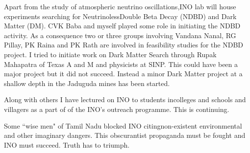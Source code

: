 Apart from the study of atmospheric neutrino oscillations,\break INO lab will 
house experiments searching for Neutrinoless\break Double Beta Decay (NDBD) 
and Dark Matter (DM). CVK Baba and myself played some role in initiating 
the NDBD activity. As a consequence two or three groups involving 
Vandana Nanal, RG Pillay, PK Raina and PK Rath are involved in 
feasibility studies for the NDBD project. I tried to initiate work on 
Dark Matter Search through Rupak Mahapatra of Texas A and M and 
physicists at SINP. This could have been a major project but it did not 
succeed. Instead a minor Dark Matter project at a shallow depth in the 
Jaduguda mines has been started.

Along with others I have lectured on INO to students in\break colleges and 
schools and villagers as a part of of the INO's outreach programme. This 
is continuing.

Some ``wise men" of Tamil Nadu blocked INO citing\break non-existent 
environmental and other imaginary dangers. This obscurantist propaganda 
must be fought and INO must succeed. Truth has to triumph.


